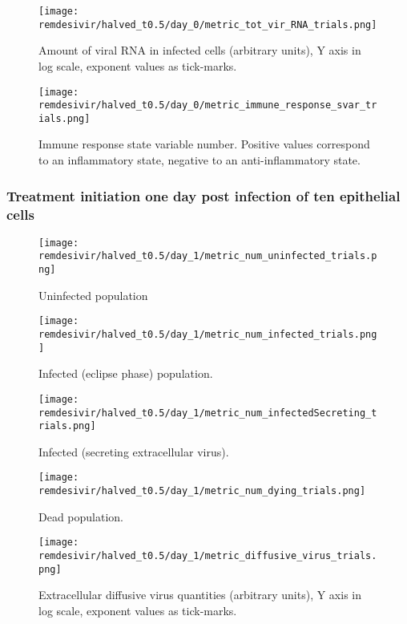 \begin{figure}[H]
\texttt{[image: remdesivir/halved\_t0.5/day\_0/metric\_tot\_vir\_RNA\_trials.png]}
\caption{Amount of viral RNA in infected cells (arbitrary units), Y axis in log scale, exponent values as tick-marks.\label{fig:app:homo_halved:day0:vir_RNA}}
\end{figure}

\begin{figure}[H]
\texttt{[image: remdesivir/halved\_t0.5/day\_0/metric\_immune\_response\_svar\_trials.png]}
\caption{Immune response state variable number. Positive values correspond to an inflammatory state, negative to an anti-inflammatory state.\label{fig:app:homo_halved:day0:immune_var}}
\end{figure}

\subsubsection{Treatment initiation one day post infection of ten epithelial cells}\label{sup:sec:extra_figures:homo_halved:day1}

\begin{figure}[H]
\texttt{[image: remdesivir/halved\_t0.5/day\_1/metric\_num\_uninfected\_trials.png]}
\caption{Uninfected population\label{fig:app:homo_halved:day1:uninf}}
\end{figure}

\begin{figure}[H]
\texttt{[image: remdesivir/halved\_t0.5/day\_1/metric\_num\_infected\_trials.png]}
\caption{Infected (eclipse phase) population.\label{fig:app:homo_halved:day1:inf}}
\end{figure}

\begin{figure}[H]
\texttt{[image: remdesivir/halved\_t0.5/day\_1/metric\_num\_infectedSecreting\_trials.png]}
\caption{Infected (secreting extracellular virus).\label{fig:app:homo_halved:day1:infSecr}}
\end{figure}

\begin{figure}[H]
\texttt{[image: remdesivir/halved\_t0.5/day\_1/metric\_num\_dying\_trials.png]}
\caption{Dead population.\label{fig:app:homo_halved:day1:dead}}
\end{figure}

\begin{figure}[H]
\texttt{[image: remdesivir/halved\_t0.5/day\_1/metric\_diffusive\_virus\_trials.png]}
\caption{Extracellular diffusive virus quantities (arbitrary units), Y axis in log scale, exponent values as tick-marks.\label{fig:app:homo_halved:day1:diff_vir}}
\end{figure}


